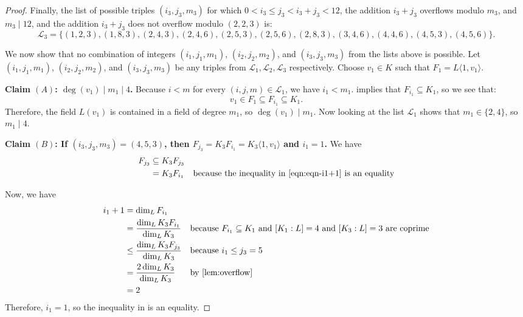 \documentclass[letterpaper,10pt]{amsart}
\newcommand{\cL}{\mathcal{L}}
\theoremstyle{definition}
\theoremstyle{remark}
\begin{document}
\begin{proof}
Finally, the list of possible triples $(i_3,j_3,m_3)$ for which $0 < i_3 \leq j_3 < i_3 + j_3 < 12$, the addition $i_3 + j_3$ overflows modulo $m_3$, and $m_3 \mid 12$, and the addition $i_3 + j_3$ does not overflow modulo $(2,2,3)$ is:
\[
	\mathcal{L}_3 = \{(1,2,3), (1,8,3), (2,4,3), (2,4,6), (2,5,3), (2,5,6), (2,8,3), (3,4,6), (4,4,6), (4,5,3), (4,5,6)\}.
\]

We now show that no combination of integers $(i_1,j_1,m_1)$, $(i_2,j_2,m_2)$, and $(i_3,j_3,m_3)$ from the lists above is possible. Let $(i_1,j_1,m_1)$, $(i_2,j_2,m_2)$, and $(i_3,j_3,m_3)$ be any triples from $\mathcal{L}_1,\mathcal{L}_2,\mathcal{L}_3$ respectively. Choose $v_1 \in K$ such that $F_1 = L\langle 1, v_1\rangle$. 

\noindent\textbf{Claim $(A)$: $\deg(v_1) \mid m_1 \mid 4$.}
Because $i < m$ for every $(i,j,m) \in \cL_1$, we have $i_1 < m_1$.  implies that $F_{i_1} \subseteq K_1$, so we see that:
\[
    v_1 \in F_1 \subseteq F_{i_1} \subseteq K_1.
\]
Therefore,  the field $L(v_1)$ is contained in a field of degree $m_1$, so $\deg(v_1) \mid m_1$. Now looking at the list $\cL_1$ shows that $m_1 \in \{2,4\}$, so $m_1 \mid 4$. 

\noindent \textbf{Claim $(B)$: If $(i_3,j_3,m_3) = (4,5,3)$, then $F_{j_3} = K_3F_{i_1} = K_3\langle 1,v_1\rangle$ and $i_1 = 1$.} 
We have
\begin{gather}
\label{eqn:fj3}
\begin{aligned}
    F_{j_3} &\subseteq K_3F_{j_3} && \\
    &= K_3F_{i_1} && \text{because the inequality in \Cref{eqn:eqn-i1+1} is an equality} \\
\end{aligned}
\end{gather}

Now, we have
\begin{gather}
\label{eqn:eqn-i1+1}
\begin{aligned}
i_1+1 &= \dim_{L} F_{i_1} && \\
&= \frac{\dim_{L} K_3 F_{i_1}}{\dim_L K_3} && \text{because $F_{i_1} \subseteq K_1$ and $[K_1 : L] = 4$ and $[K_3 : L] = 3$ are coprime}\\ 
&\leq \frac{\dim_{L} K_3 F_{j_3}}{\dim_{L} K_3 } && \text{because $i_1 \leq j_3 = 5$}\\
&= \frac{2 \dim_{L} K_3}{\dim_{L} K_3 } && \text{by \Cref{lem:overflow}}\\
&= 2 &&
\end{aligned}
\end{gather}
Therefore, $i_1 = 1$, so the inequality in  is an equality. 


\end{proof}
\end{document}
